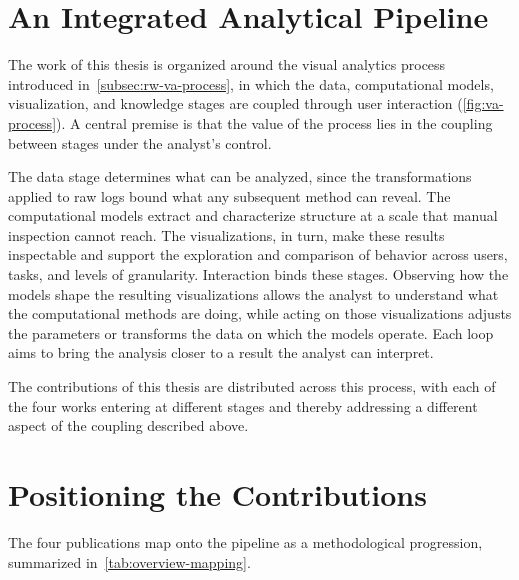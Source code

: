 \section{An Integrated Analytical Pipeline}

The work of this thesis is organized around the visual analytics process introduced in~\cref{subsec:rw-va-process}, in which the data, computational models, visualization, and knowledge stages are coupled through user interaction (\cref{fig:va-process}).
A central premise is that the value of the process lies in the coupling between stages under the analyst's control.

The data stage determines what can be analyzed, since the transformations applied to raw logs bound what any subsequent method can reveal.
The computational models extract and characterize structure at a scale that manual inspection cannot reach.
The visualizations, in turn, make these results inspectable and support the exploration and comparison of behavior across users, tasks, and levels of granularity.
Interaction binds these stages.
Observing how the models shape the resulting visualizations allows the analyst to understand what the computational methods are doing, while acting on those visualizations adjusts the parameters or transforms the data on which the models operate.
Each loop aims to bring the analysis closer to a result the analyst can interpret.

The contributions of this thesis are distributed across this process, with each of the four works entering at different stages and thereby addressing a different aspect of the coupling described above.





\section{Positioning the Contributions}

The four publications map onto the pipeline as a methodological progression, summarized in~\cref{tab:overview-mapping}.

